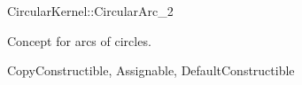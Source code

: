 \begin{ccRefConcept}{CircularKernel::CircularArc_2}

Concept for arcs of circles.

\ccRefines
CopyConstructible, Assignable, DefaultConstructible

\ccHasModels
{}
\end{ccRefConcept}
